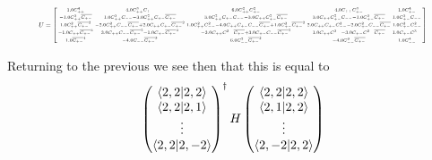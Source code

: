 \documentclass[11pt]{article} %
\begin{document}
\begin{equation}\resizebox{.9\hsize}{!}{$
U=
\left[\begin{smallmatrix}1.0 C_{{++}}^{4} & 4.0 C_{{++}}^{3} C_{{+-}} & 6.0 C_{{
++}}^{2} C_{{+-}}^{2} & 4.0 C_{{++}} C_{{+-}}^{3} & 1.0 C_{{+-}}^{4}\\- 1.0 C_{{
++}}^{3} \overline{C_{{+-}}} & 1.0 C_{{++}}^{3} C_{{--}} - 3.0 C_{{++}}^{2} C_{{
+-}} \overline{C_{{+-}}} & 3.0 C_{{++}}^{2} C_{{+-}} C_{{--}} - 3.0 C_{{++}} C_{
{+-}}^{2} \overline{C_{{+-}}} & 3.0 C_{{++}} C_{{+-}}^{2} C_{{--}} - 1.0 C_{{+-}
}^{3} \overline{C_{{+-}}} & 1.0 C_{{+-}}^{3} C_{{--}}\\1.0 C_{{++}}^{2} \overline{C_{{+-}}}^{2} & - 2.0 C_{{++}}^{2} C_{{--}} \overline{C_{{+-}}} + 2.0 C_{{++}}
 C_{{+-}} \overline{C_{{+-}}}^{2} & 1.0 C_{{++}}^{2} C_{{--}}^{2} - 4.0 C_{{++}}
 C_{{+-}} C_{{--}} \overline{C_{{+-}}} + 1.0 C_{{+-}}^{2} \overline{C_{{+-}}}^{2
} & 2.0 C_{{++}} C_{{+-}} C_{{--}}^{2} - 2.0 C_{{+-}}^{2} C_{{--}} \overline{C_{
{+-}}} & 1.0 C_{{+-}}^{2} C_{{--}}^{2}\\- 1.0 C_{{++}} \overline{C_{{+-}}}^{3} &
 3.0 C_{{++}} C_{{--}} \overline{C_{{+-}}}^{2} - 1.0 C_{{+-}} \overline{C_{{+-}}
}^{3} & - 3.0 C_{{++}} C_{{--}}^{2} \overline{C_{{+-}}} + 3.0 C_{{+-}} C_{{--}} 
\overline{C_{{+-}}}^{2} & 1.0 C_{{++}} C_{{--}}^{3} - 3.0 C_{{+-}} C_{{--}}^{2} 
\overline{C_{{+-}}} & 1.0 C_{{+-}} C_{{--}}^{3}\\1.0 \overline{C_{{+-}}}^{4} & -
 4.0 C_{{--}} \overline{C_{{+-}}}^{3} & 6.0 C_{{--}}^{2} \overline{C_{{+-}}}^{2}
 & - 4.0 C_{{--}}^{3} \overline{C_{{+-}}} & 1.0 C_{{--}}^{4}\end{smallmatrix}\right]$}\end{equation}

Returning to the previous we see then that this is equal to\\

\begin{equation}
\begin{pmatrix} \braket{2,2|2,2} \\ \braket{2,2|2,1} \\ \vdots \\ \braket{2,2|2,-2} \end{pmatrix}^\dagger H \begin{pmatrix} \braket{2,2|2,2} \\ \braket{2,1|2,2} \\ \vdots \\ \braket{2,-2|2,2}\end{pmatrix}\end{equation}
\end{document}
